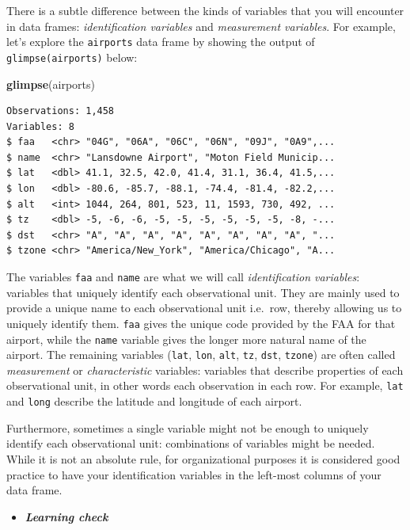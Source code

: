 \documentclass[12pt, krantz2,]{krantz}
\makeatletter
\newenvironment{Shaded}{\begin{snugshade}}{\end{snugshade}}
\newcommand{\KeywordTok}[1]{\textcolor[rgb]{0.27,0.27,0.27}{\textbf{#1}}}
\newcommand{\NormalTok}[1]{#1}
\newenvironment{kframe}{%
\medskip{}
\setlength{\fboxsep}{.8em}
 \def\at@end@of@kframe{}%
 \ifinner\ifhmode%
  \def\at@end@of@kframe{\end{minipage}}%
  \begin{minipage}{\columnwidth}%
 \fi\fi%
 \def\FrameCommand##1{\hskip\@totalleftmargin \hskip-\fboxsep
 \colorbox{shadecolor}{##1}\hskip-\fboxsep
     \hskip-\linewidth \hskip-\@totalleftmargin \hskip\columnwidth}%
 \MakeFramed {\advance\hsize-\width
   \@totalleftmargin\z@ \linewidth\hsize
   \@setminipage}}%
 {\par\unskip\endMakeFramed%
 \at@end@of@kframe}
\renewenvironment{Shaded}{\begin{kframe}}{\end{kframe}}
\newenvironment{rmdblock}[1]
  {\begin{shaded*}
  \begin{itemize}
  \renewcommand{\labelitemi}{
    \raisebox{-.7\height}[0pt][0pt]{
    }
  }
  \item
  }
  {
  \end{itemize}
  \end{shaded*}
  }
\newenvironment{learncheck}
  {\begin{rmdblock}{warning}}
  {\end{rmdblock}}
\makeatother
\begin{document}
There is a subtle difference between the kinds of variables that you will encounter in data frames: \emph{identification variables} and \emph{measurement variables}. For example, let's explore the \texttt{airports} data frame by showing the output of \texttt{glimpse(airports)} below:

\begin{Shaded}
\begin{Highlighting}[]
\KeywordTok{glimpse}\NormalTok{(airports)}
\end{Highlighting}
\end{Shaded}

\begin{verbatim}
Observations: 1,458
Variables: 8
$ faa   <chr> "04G", "06A", "06C", "06N", "09J", "0A9",...
$ name  <chr> "Lansdowne Airport", "Moton Field Municip...
$ lat   <dbl> 41.1, 32.5, 42.0, 41.4, 31.1, 36.4, 41.5,...
$ lon   <dbl> -80.6, -85.7, -88.1, -74.4, -81.4, -82.2,...
$ alt   <int> 1044, 264, 801, 523, 11, 1593, 730, 492, ...
$ tz    <dbl> -5, -6, -6, -5, -5, -5, -5, -5, -5, -8, -...
$ dst   <chr> "A", "A", "A", "A", "A", "A", "A", "A", "...
$ tzone <chr> "America/New_York", "America/Chicago", "A...
\end{verbatim}

The variables \texttt{faa} and \texttt{name} are what we will call \emph{identification variables}: variables that uniquely identify each observational unit. They are mainly used to provide a unique name to each observational unit i.e.~row, thereby allowing us to uniquely identify them. \texttt{faa} gives the unique code provided by the FAA for that airport, while the \texttt{name} variable gives the longer more natural name of the airport. The remaining variables (\texttt{lat}, \texttt{lon}, \texttt{alt}, \texttt{tz}, \texttt{dst}, \texttt{tzone}) are often called \emph{measurement} or \emph{characteristic} variables: variables that describe properties of each observational unit, in other words each observation in each row. For example, \texttt{lat} and \texttt{long} describe the latitude and longitude of each airport.

Furthermore, sometimes a single variable might not be enough to uniquely identify each observational unit: combinations of variables might be needed. While it is not an absolute rule, for organizational purposes it is considered good practice to have your identification variables in the left-most columns of your data frame.

\begin{learncheck}
\textbf{\emph{Learning check}}
\end{learncheck}
\end{document}
